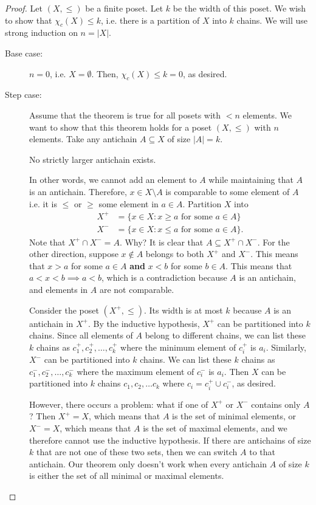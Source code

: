 \begin{proof}
	Let \( (X, \le ) \) be a finite poset. Let \( k \) be the width of this poset. We wish to show that \( \chi_c(X) \le k \), i.e. there is a partition of \( X \) into \( k \) chains. We will use strong induction on \( n = |X|\).
	\begin{description}
		\item[Base case:] \( n=0 \), i.e. \( X = \emptyset \). Then, \( \chi_c(X) \le k = 0 \), as desired.
		\item[Step case:] Assume that the theorem is true for all posets with \( <n \) elements. We want to show that this theorem holds for a poset \( (X,\le ) \) with \( n \) elements. Take any antichain \( A \subseteq X \) of size \( |A|=k \).
			\begin{observe}
				No strictly larger antichain exists.
			\end{observe}
			In other words, we cannot add an element to \( A \) while maintaining that \( A \) is an antichain. Therefore, \( x \in X\setminus A \) is comparable to some element of \( A \) i.e. it is \( \le  \) or \( \ge  \) some element in \( a \in A \). Partition \( X \) into 
			\begin{align*}
				X^+ &= \{x \in X \colon x \ge a \text{ for some } a \in A\}  \\
				X^- &= \{x \in X \colon x \le a \text{ for some } a \in A\}  
			.\end{align*}
			Note that \( X^+ \cap X^- = A \). Why? It is clear that \( A \subseteq X^+\cap X^- \). For the other direction, suppose \( x \not\in A \) belongs to both \( X^+ \) and \( X^- \). This means that \( x > a \) for some \( a \in A \) \textbf{and} \( x<b \) for some \( b \in A \). This means that \( a<x<b \implies a<b \), which is a contradiction because \( A \) is an antichain, and elements in \( A \) are not comparable.

			Consider the poset \( (X^+, \le) \). Its width is at most \( k \) because \( A \) is an antichain in \( X^+ \). By the inductive hypothesis, \( X^+ \) can be partitioned into \( k \) chains. Since all elements of \( A \) belong to different chains, we can list these \( k \) chains as \( c_{1}^+,c_{2}^+,\ldots ,c_k^+ \) where the minimum element of \( c_i^+ \) is \( a_i \). Similarly, \( X^- \) can be partitioned into \( k \) chains. We can list these \( k \) chains as \( c_{1}^-,c_{2}^-, \ldots , c_k^- \) where the maximum element of \( c_i^- \) is \( a_i \). Then \( X \) can be partitioned into \( k \) chains \( c_{1},c_{2},\ldots c_k \) where \( c_i=c_i^+ \cup c_i^- \), as desired.

			However, there occurs a problem: what if one of \( X^+ \) or \( X^- \) contains only \( A \)? Then \( X^+=X \), which means that \( A \) is the set of minimal elements, or \( X^-=X \), which means that \( A  \) is the set of maximal elements, and we therefore cannot use the inductive hypothesis. If there are antichains of size \( k \) that are not one of these two sets, then we can switch \( A \) to that antichain. Our theorem only doesn't work when every antichain \( A \) of size \( k \) is either the set of all minimal or maximal elements.
\end{description}
\end{proof}
